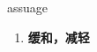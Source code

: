 
\begin{frame}
{\huge assuage}
\begin{center}
\begin{enumerate}\Large
  \item \textbf{缓和，减轻}
\end{enumerate}
\end{center}
\end{frame}

